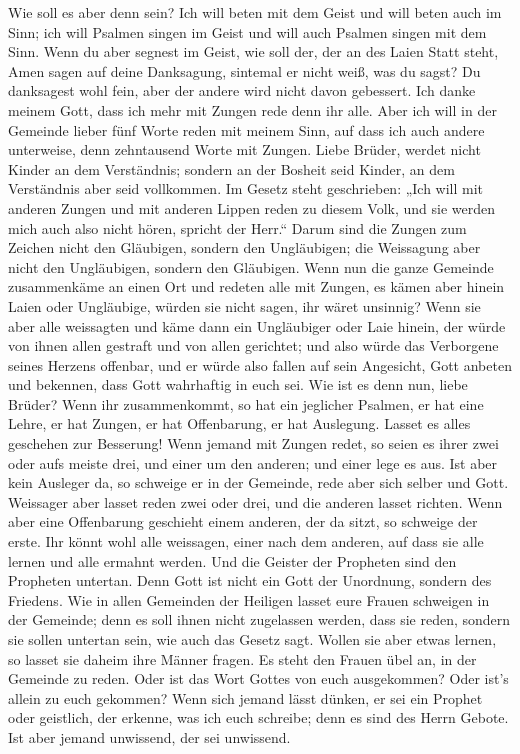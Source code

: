  Wie soll es aber denn sein? Ich will beten mit dem Geist
und will beten auch im Sinn; ich will Psalmen singen im Geist und will
auch Psalmen singen mit dem Sinn.  Wenn du aber segnest
im Geist, wie soll der, der an des Laien Statt steht, Amen sagen auf
deine Danksagung, sintemal er nicht weiß, was du sagst? 
Du danksagest wohl fein, aber der andere wird nicht davon gebessert.
 Ich danke meinem Gott, dass ich mehr mit Zungen rede
denn ihr alle.  Aber ich will in der Gemeinde lieber fünf
Worte reden mit meinem Sinn, auf dass ich auch andere unterweise, denn
zehntausend Worte mit Zungen.  Liebe Brüder, werdet nicht
Kinder an dem Verständnis; sondern an der Bosheit seid Kinder, an dem
Verständnis aber seid vollkommen.  Im Gesetz steht
geschrieben: „Ich will mit anderen Zungen und mit anderen Lippen reden
zu diesem Volk, und sie werden mich auch also nicht hören, spricht der
Herr.``  Darum sind die Zungen zum Zeichen nicht den
Gläubigen, sondern den Ungläubigen; die Weissagung aber nicht den
Ungläubigen, sondern den Gläubigen.  Wenn nun die ganze
Gemeinde zusammenkäme an einen Ort und redeten alle mit Zungen, es kämen
aber hinein Laien oder Ungläubige, würden sie nicht sagen, ihr wäret
unsinnig?  Wenn sie aber alle weissagten und käme dann
ein Ungläubiger oder Laie hinein, der würde von ihnen allen gestraft und
von allen gerichtet;  und also würde das Verborgene
seines Herzens offenbar, und er würde also fallen auf sein Angesicht,
Gott anbeten und bekennen, dass Gott wahrhaftig in euch sei.
 Wie ist es denn nun, liebe Brüder? Wenn ihr
zusammenkommt, so hat ein jeglicher Psalmen, er hat eine Lehre, er hat
Zungen, er hat Offenbarung, er hat Auslegung. Lasset es alles geschehen
zur Besserung!  Wenn jemand mit Zungen redet, so seien es
ihrer zwei oder aufs meiste drei, und einer um den anderen; und einer
lege es aus.  Ist aber kein Ausleger da, so schweige er
in der Gemeinde, rede aber sich selber und Gott. 
Weissager aber lasset reden zwei oder drei, und die anderen lasset
richten.  Wenn aber eine Offenbarung geschieht einem
anderen, der da sitzt, so schweige der erste.  Ihr könnt
wohl alle weissagen, einer nach dem anderen, auf dass sie alle lernen
und alle ermahnt werden.  Und die Geister der Propheten
sind den Propheten untertan.  Denn Gott ist nicht ein
Gott der Unordnung, sondern des Friedens.  Wie in allen
Gemeinden der Heiligen lasset eure Frauen schweigen in der Gemeinde;
denn es soll ihnen nicht zugelassen werden, dass sie reden, sondern sie
sollen untertan sein, wie auch das Gesetz sagt.  Wollen
sie aber etwas lernen, so lasset sie daheim ihre Männer fragen. Es steht
den Frauen übel an, in der Gemeinde zu reden.  Oder ist
das Wort Gottes von euch ausgekommen? Oder ist's allein zu euch
gekommen?  Wenn sich jemand lässt dünken, er sei ein
Prophet oder geistlich, der erkenne, was ich euch schreibe; denn es sind
des Herrn Gebote.  Ist aber jemand unwissend, der sei
unwissend.

